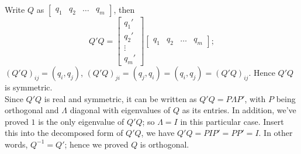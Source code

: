 \documentclass[11pt]{article}
\begin{document}
\subsection{}
Write $Q$ as $\begin{bmatrix} q_1 & q_2 & \dots &q_m\end{bmatrix}$, then $$Q'Q=\begin{bmatrix} q_1'\\q_2'\\\vdots\\q_m'\end{bmatrix}\begin{bmatrix} q_1&q_2&\dots&q_m\end{bmatrix}; $$ $(Q'Q)_{ij}=(q_i,q_j)$, $(Q'Q)_{ji}=(q_j,q_i)=(q_i,q_j)=(Q'Q)_{ij}$. Hence $Q'Q$ is symmetric.\\[0.5cm]
Since $Q'Q$ is real and symmetric, it can be written as $Q'Q=P\Lambda P'$, with $P$ being orthogonal and $\Lambda$ diagonal with eigenvalues of $Q$ as its entries. In addition, we've proved $1$ is the only eigenvalue of $Q'Q$; so $\Lambda=I$ in this particular case. Insert this into the decomposed form of $Q'Q$, we have $Q'Q=PIP'=PP'=I$. In other words, $Q^{-1}=Q'$; hence we proved $Q$ is orthogonal.
\section{}
\end{document}

